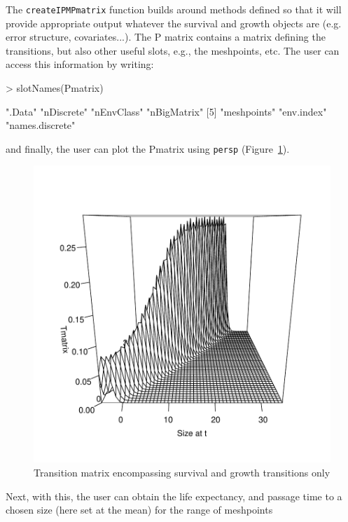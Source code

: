 \documentclass{article}
\begin{document}
The {\tt createIPMPmatrix} function builds around methods defined so that it will provide appropriate output whatever the survival and growth objects are (e.g. error structure, covariates...). The P matrix contains a matrix defining the transitions, but also other useful slots, e.g., the meshpoints, etc. The user can access this information by writing: 
\begin{Schunk}
\begin{Sinput}
> slotNames(Pmatrix)
\end{Sinput}
\begin{Soutput}
[1] ".Data"          "nDiscrete"      "nEnvClass"      "nBigMatrix"    
[5] "meshpoints"     "env.index"      "names.discrete"
\end{Soutput}
\end{Schunk}
and finally, the user can plot the Pmatrix using {\tt persp} (Figure~\ref{fig:two}). 
\begin{figure}
\begin{center}
\includegraphics{IPMpack_Vignette-fig2}
\end{center}
\caption{Transition matrix encompassing survival and growth transitions only}
\label{fig:two}
\end{figure}
Next, with this, the user can obtain the life expectancy, and passage time to a chosen size (here set at the mean) for the range of meshpoints
\end{document}
